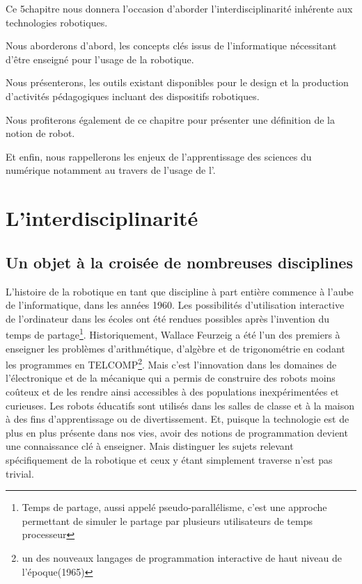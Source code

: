\begin{resumChap}
Ce 5\ieme chapitre nous donnera l'occasion d'aborder l'interdisciplinarité inhérente aux technologies robotiques.\par%
Nous aborderons d'abord, les concepts clés issus de l'informatique nécessitant d'être enseigné pour l'usage de la robotique.\par%
Nous présenterons, les outils existant disponibles pour le design et la production d'activités pédagogiques incluant des dispositifs robotiques.\par%
Nous profiterons également de ce chapitre pour présenter une définition de la notion de robot.\par%
Et enfin, nous rappellerons les enjeux de l'apprentissage des sciences du numérique notamment au travers de l'usage de l'.
\end{resumChap}{}
\section{L'interdisciplinarité}\label{sec:pluri_bot}
    \subsection{Un objet à la croisée de nombreuses disciplines}
        L'histoire de la robotique en tant que discipline à part entière commence à l'aube de l'informatique, dans les années 1960. Les possibilités d'utilisation interactive de l'ordinateur dans les écoles ont été rendues possibles après l'invention du temps de partage\footnote{Temps de partage, aussi appelé pseudo-parallélisme, c'est une approche permettant de simuler le partage par plusieurs utilisateurs de temps processeur}. Historiquement, Wallace Feurzeig a été l'un des premiers à enseigner  les problèmes d'arithmétique, d'algèbre et de trigonométrie en codant les programmes en TELCOMP\footnote{un des nouveaux langages de programmation interactive de haut niveau de l'époque(1965)}. 
        Mais c'est l'innovation dans les domaines de l'électronique et de la mécanique qui a permis de construire des robots moins coûteux et de les rendre ainsi accessibles à des populations inexpérimentées et curieuses. 
        Les robots éducatifs sont utilisés dans les salles de classe et à la maison à des fins d’apprentissage ou de divertissement. Et, puisque la technologie est de plus en plus présente dans nos vies, avoir des notions de programmation devient une connaissance clé à enseigner.
        Mais distinguer les sujets relevant spécifiquement de la robotique et ceux y étant simplement traverse n'est pas trivial.
